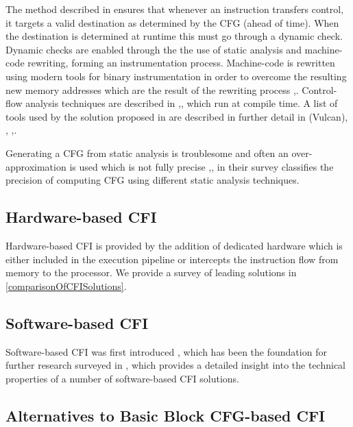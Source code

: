 The method described in \cite{Abadi2005} ensures that whenever an instruction transfers control, it targets a valid destination as determined by the CFG (ahead of time). When the destination is determined at runtime this must go through a dynamic check. Dynamic checks are enabled through the the use of static analysis and machine-code rewriting, forming an instrumentation process. Machine-code is rewritten using modern tools for binary instrumentation in order to overcome the resulting new memory addresses which are the result of the rewriting process \cite{Edwards2001},\cite{Srivastava1994}. Control-flow analysis techniques are described in \cite{AhoAlfredV.2014C:pt},\cite{Atkinson},\cite{Wagner2002} which run at compile time. A list of tools used by the solution proposed in \cite{Abadi2005} are described in further detail in \cite{Edwards2001}(Vulcan), \cite{AhoAlfredV.2014C:pt},\cite{Feng2003} \cite{Gopalakrishna2005},\cite{Wagner2002}.

Generating a CFG from static analysis is troublesome and often an over-approximation is used which is not fully precise \cite{Carlini2015},\cite{Kinder2012}, in their survey \cite{Burow} classifies the precision of computing CFG using different static analysis techniques.

\subsection{Hardware-based CFI}

Hardware-based CFI is provided by the addition of dedicated hardware which is either included in the execution pipeline or intercepts the instruction flow from memory to the processor. We provide a survey of leading solutions in \ref{comparisonOfCFISolutions}.

\subsection{Software-based CFI}

Software-based CFI was first introduced \cite{Abadi2005}, which has been the foundation for further research surveyed in \cite{Burow}, which provides a detailed insight into the technical properties of a number of software-based CFI solutions.

\subsection{Alternatives to Basic Block CFG-based CFI}

